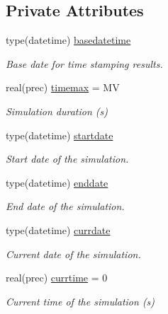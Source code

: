 \subsection*{Private Attributes}
\begin{DoxyCompactItemize}
\item 
type(datetime) \mbox{\hyperlink{structsimulationglobals__mod_1_1sim__time__t_acb3499d167bf9a0c7f6974efa8f88424}{basedatetime}}
\begin{DoxyCompactList}\small\item\em Base date for time stamping results. \end{DoxyCompactList}\item 
real(prec) \mbox{\hyperlink{structsimulationglobals__mod_1_1sim__time__t_ae84053cfbfb0b731cbf15e7334f223cd}{timemax}} = MV
\begin{DoxyCompactList}\small\item\em Simulation duration (s) \end{DoxyCompactList}\item 
type(datetime) \mbox{\hyperlink{structsimulationglobals__mod_1_1sim__time__t_a4d412156c617a836839456e857e249de}{startdate}}
\begin{DoxyCompactList}\small\item\em Start date of the simulation. \end{DoxyCompactList}\item 
type(datetime) \mbox{\hyperlink{structsimulationglobals__mod_1_1sim__time__t_aaaf97413c1d145b1eb979ad2abbdd90e}{enddate}}
\begin{DoxyCompactList}\small\item\em End date of the simulation. \end{DoxyCompactList}\item 
type(datetime) \mbox{\hyperlink{structsimulationglobals__mod_1_1sim__time__t_a547910a1c56076286ad768d6862725a5}{currdate}}
\begin{DoxyCompactList}\small\item\em Current date of the simulation. \end{DoxyCompactList}\item 
real(prec) \mbox{\hyperlink{structsimulationglobals__mod_1_1sim__time__t_aef4f2cbfeae48936accb80bcc819b778}{currtime}} = 0
\begin{DoxyCompactList}\small\item\em Current time of the simulation (s) \end{DoxyCompactList}\end{DoxyCompactItemize}


